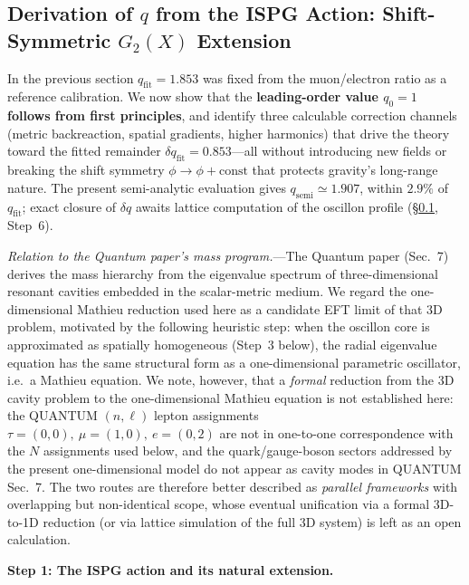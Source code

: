 \documentclass[11pt]{article}
\begin{document}
\subsection{Derivation of $q$ from the ISPG Action:
  Shift-Symmetric $G_2(X)$ Extension}
\label{sec:q_derivation}

In the previous section $q_{\mathrm{fit}} = 1.853$ was fixed
from the muon/electron ratio as a reference calibration. We now
show that the \textbf{leading-order value $q_0 = 1$ follows from
first principles}, and identify three calculable correction
channels (metric backreaction, spatial gradients, higher
harmonics) that drive the theory toward the fitted remainder
$\delta q_{\mathrm{fit}} = 0.853$---all without introducing new
fields or breaking the shift symmetry
$\phi \to \phi + \mathrm{const}$ that protects gravity's
long-range nature. The present semi-analytic evaluation gives
$q_{\mathrm{semi}}\simeq 1.907$, within $2.9\%$ of
$q_{\mathrm{fit}}$; exact closure of $\delta q$ awaits lattice
computation of the oscillon profile (\S\ref{sec:q_derivation},
Step~6).

\textit{Relation to the Quantum paper's mass program.}---The
Quantum paper (Sec.~7) derives the mass hierarchy from the
eigenvalue spectrum of three-dimensional resonant cavities
embedded in the scalar-metric medium.  We regard the
one-dimensional Mathieu reduction used here as a candidate
EFT limit of that 3D problem, motivated by the following
heuristic step: when the oscillon core is approximated as
spatially homogeneous (Step~3 below), the radial eigenvalue
equation has the same structural form as a one-dimensional
parametric oscillator, i.e.\ a Mathieu equation.  We note,
however, that a \emph{formal} reduction from the 3D cavity
problem to the one-dimensional Mathieu equation is not
established here: the QUANTUM $(n,\ell)$ lepton assignments
$\tau=(0,0),\ \mu=(1,0),\ e=(0,2)$ are not in one-to-one
correspondence with the $N$ assignments used below, and the
quark/gauge-boson sectors addressed by the present
one-dimensional model do not appear as cavity modes in
QUANTUM Sec.~7.  The two routes are therefore better
described as \emph{parallel frameworks} with overlapping
but non-identical scope, whose eventual unification via a
formal 3D-to-1D reduction (or via lattice simulation of the
full 3D system) is left as an open calculation.

\medskip
\textbf{Step 1: The ISPG action and its natural extension.}
\end{document}
